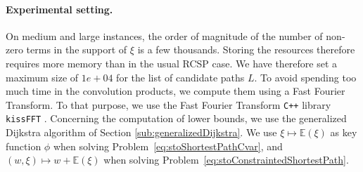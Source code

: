 \documentclass[11pt]{amsart}
\theoremstyle{plain}
\theoremstyle{remark}
\def\E{\mathbb{E}}
\begin{document}
\paragraph{Experimental setting.} On medium and large instances, the order of magnitude of the number of non-zero terms in the support of $\xi$ is a few thousands. Storing the resources therefore requires more memory than in the usual RCSP case. We have therefore set a maximum size of $1e+04$ for the list of candidate paths $L$. To avoid spending too much time in the convolution products, we compute them using a Fast Fourier Transform. To that purpose, we use the Fast Fourier Transform \texttt{C++} library \texttt{kissFFT} \cite{kissFFT}. Concerning the computation of lower bounds, we use the generalized Dijkstra algorithm of Section \ref{sub:generalizedDijkstra}. We use $\xi \mapsto \E(\xi)$ as key function $\phi$ when solving Problem~\eqref{eq:stoShortestPathCvar}, and $(w,\xi)\mapsto w + \E(\xi)$ when solving Problem~\eqref{eq:stoConstraintedShortestPath}.
\end{document}
